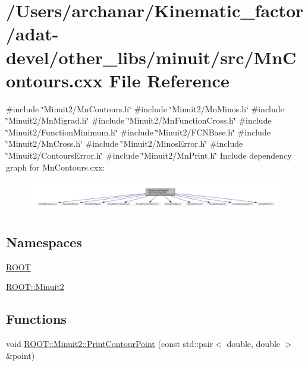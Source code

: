 \hypertarget{adat-devel_2other__libs_2minuit_2src_2MnContours_8cxx}{}\section{/\+Users/archanar/\+Kinematic\+\_\+factor/adat-\/devel/other\+\_\+libs/minuit/src/\+Mn\+Contours.cxx File Reference}
\label{adat-devel_2other__libs_2minuit_2src_2MnContours_8cxx}
{\ttfamily \#include \char`\"{}Minuit2/\+Mn\+Contours.\+h\char`\"{}}\newline
{\ttfamily \#include \char`\"{}Minuit2/\+Mn\+Minos.\+h\char`\"{}}\newline
{\ttfamily \#include \char`\"{}Minuit2/\+Mn\+Migrad.\+h\char`\"{}}\newline
{\ttfamily \#include \char`\"{}Minuit2/\+Mn\+Function\+Cross.\+h\char`\"{}}\newline
{\ttfamily \#include \char`\"{}Minuit2/\+Function\+Minimum.\+h\char`\"{}}\newline
{\ttfamily \#include \char`\"{}Minuit2/\+F\+C\+N\+Base.\+h\char`\"{}}\newline
{\ttfamily \#include \char`\"{}Minuit2/\+Mn\+Cross.\+h\char`\"{}}\newline
{\ttfamily \#include \char`\"{}Minuit2/\+Minos\+Error.\+h\char`\"{}}\newline
{\ttfamily \#include \char`\"{}Minuit2/\+Contours\+Error.\+h\char`\"{}}\newline
{\ttfamily \#include \char`\"{}Minuit2/\+Mn\+Print.\+h\char`\"{}}\newline
Include dependency graph for Mn\+Contours.\+cxx\+:
\nopagebreak
\begin{figure}[H]
\begin{center}
\leavevmode
\includegraphics[width=350pt]{d8/d1b/adat-devel_2other__libs_2minuit_2src_2MnContours_8cxx__incl}
\end{center}
\end{figure}
\subsection*{Namespaces}
\begin{DoxyCompactItemize}
\item 
 \mbox{\hyperlink{namespaceROOT}{R\+O\+OT}}
\item 
 \mbox{\hyperlink{namespaceROOT_1_1Minuit2}{R\+O\+O\+T\+::\+Minuit2}}
\end{DoxyCompactItemize}
\subsection*{Functions}
\begin{DoxyCompactItemize}
\item 
void \mbox{\hyperlink{namespaceROOT_1_1Minuit2_a4075583a4cbc4a719ed2ec32e1d76bbf}{R\+O\+O\+T\+::\+Minuit2\+::\+Print\+Contour\+Point}} (const std\+::pair$<$ double, double $>$ \&point)
\end{DoxyCompactItemize}
